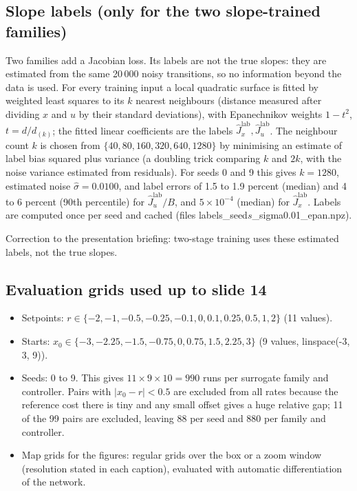 \documentclass[11pt]{article}
\begin{document}
\subsection{Slope labels (only for the two slope-trained families)}\label{sec:labels}
Two families add a Jacobian loss. Its labels are not the true slopes: they are estimated from the same 20\,000 noisy transitions, so no information beyond the data is used. For every training input a local quadratic surface is fitted by weighted least squares to its $k$ nearest neighbours (distance measured after dividing $x$ and $u$ by their standard deviations), with Epanechnikov weights $1-t^2$, $t=d/d_{(k)}$; the fitted linear coefficients are the labels $\hat J_x^{\text{lab}},\hat J_u^{\text{lab}}$. The neighbour count $k$ is chosen from $\{40,80,160,320,640,1280\}$ by minimising an estimate of label bias squared plus variance (a doubling trick comparing $k$ and $2k$, with the noise variance estimated from residuals). For seeds 0 and 9 this gives $k=1280$, estimated noise $\hat\sigma=0.0100$, and label errors of 1.5 to 1.9 percent (median) and 4 to 6 percent (90th percentile) for $\hat J_u^{\text{lab}}/B$, and $5\times10^{-4}$ (median) for $\hat J_x^{\text{lab}}$. Labels are computed once per seed and cached (files labels\_seed$s$\_sigma0.01\_epan.npz).

Correction to the presentation briefing: two-stage training uses these estimated labels, not the true slopes.

\subsection{Evaluation grids used up to slide 14}\label{sec:grids}
\begin{itemize}
\item Setpoints: $r\in\{-2,-1,-0.5,-0.25,-0.1,0,0.1,0.25,0.5,1,2\}$ (11 values).
\item Starts: $x_0\in\{-3,-2.25,-1.5,-0.75,0,0.75,1.5,2.25,3\}$ (9 values, linspace(-3, 3, 9)).
\item Seeds: 0 to 9. This gives $11\times 9\times 10=990$ runs per surrogate family and controller. Pairs with $|x_0-r|<0.5$ are excluded from all rates because the reference cost there is tiny and any small offset gives a huge relative gap; 11 of the 99 pairs are excluded, leaving 88 per seed and 880 per family and controller.
\item Map grids for the figures: regular grids over the box or a zoom window (resolution stated in each caption), evaluated with automatic differentiation of the network.
\end{itemize}
\end{document}
